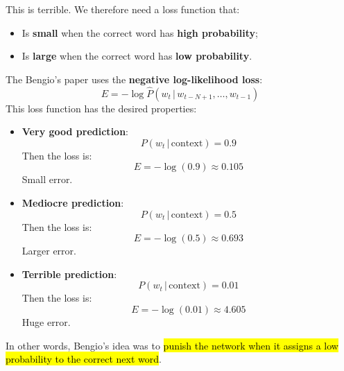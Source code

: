 \noindent
This is terrible. We therefore need a loss function that:
\begin{itemize}
    \item Is \textbf{small} when the correct word has \textbf{high probability};
    \item Is \textbf{large} when the correct word has \textbf{low probability}.
\end{itemize}
The Bengio's paper uses the \textbf{negative log-likelihood loss}:
\begin{equation}\label{eq:negative-log-likelihood-loss-bengio}
    E = -\log \hat{P}\left(w_t \, | \, w_{t-N+1}, \dots, w_{t-1}\right)
\end{equation}
This loss function has the desired properties:
\begin{itemize}
    \item \textbf{Very good prediction}:
    \begin{equation*}
        P\left(w_t \, | \, \text{context}\right) = 0.9
    \end{equation*}
    Then the loss is:
    \begin{equation*}
        E = -\log\left(0.9\right) \approx 0.105
    \end{equation*}
    Small error.
    \item \textbf{Mediocre prediction}:
    \begin{equation*}
        P\left(w_t \, | \, \text{context}\right) = 0.5
    \end{equation*}
    Then the loss is:
    \begin{equation*}
        E = -\log\left(0.5\right) \approx 0.693
    \end{equation*}
    Larger error.
    \item \textbf{Terrible prediction}:
    \begin{equation*}
        P\left(w_t \, | \, \text{context}\right) = 0.01
    \end{equation*}
    Then the loss is:
    \begin{equation*}
        E = -\log\left(0.01\right) \approx 4.605
    \end{equation*}
    Huge error.
\end{itemize}
In other words, Bengio's idea was to \hl{punish the network when it assigns a low probability to the correct next word}.

